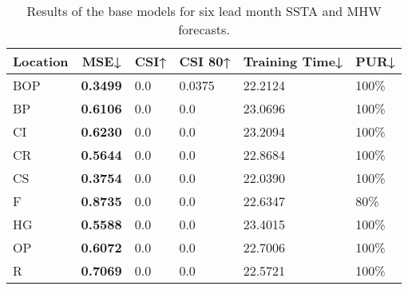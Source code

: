 \documentclass[11pt, a4paper]{article}
\begin{document}
\begin{table}[H]
\centering
\small
\caption{Results of the base models for six lead month SSTA and MHW forecasts.}
\begin{tabular}{llllll}
\multicolumn{1}{c}{\textbf{Location}} & \multicolumn{1}{c}{\textbf{MSE↓}} & \multicolumn{1}{c}{\textbf{CSI↑}} & \multicolumn{1}{c}{\textbf{CSI 80↑}} & \multicolumn{1}{c}{\textbf{Training Time↓}} & \multicolumn{1}{c}{\textbf{PUR↓}} \\ \hline
BOP                         & \textbf{0.3499}                   & 0.0                               & 0.0375                               & 22.2124                            & 100\%                     \\
BP                        & \textbf{0.6106}                   & 0.0                               & 0.0                                  & 23.0696                            & 100\%                     \\
CI                        & \textbf{0.6230}                   & 0.0                               & 0.0                                  & 23.2094                            & 100\%                     \\
CR                           & \textbf{0.5644}                   & 0.0                               & 0.0                                  & 22.8684                            & 100\%                     \\
CS                           & \textbf{0.3754}                   & 0.0                               & 0.0                                  & 22.0390                            & 100\%                     \\
F                             & \textbf{0.8735}                   & 0.0                               & 0.0                                  & 22.6347                            & 80\%                      \\
HG                          & \textbf{0.5588}                   & 0.0                               & 0.0                                  & 23.4015                            & 100\%                     \\
OP                       & \textbf{0.6072}                   & 0.0                               & 0.0                                  & 22.7006                            & 100\%                     \\
R                                & \textbf{0.7069}                   & 0.0                               & 0.0                                  & 22.5721                            & 100\%                     \\

\end{tabular}
\end{table}
\end{document}
